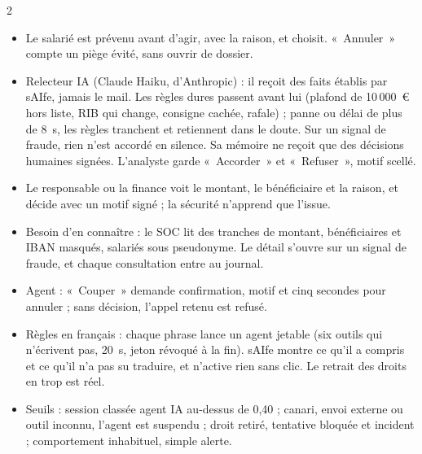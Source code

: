 \documentclass[7.6pt]{extarticle}
\newcommand{\h}[1]{\vspace{2pt}{\bfseries\color{accent}\small #1}\par\vspace{0.3pt}}
\begin{document}
\begin{multicols}{2}
\h{Comment l’humain garde la main}
\begin{itemize}
\item Le salarié est prévenu avant d’agir, avec la raison, et choisit. «~Annuler~» compte un piège évité, sans ouvrir de dossier.
\item Relecteur IA (Claude Haiku, d’Anthropic) : il reçoit des faits établis par sAIfe, jamais le mail. Les règles dures passent avant lui (plafond de 10\,000~€ hors liste, RIB qui change, consigne cachée, rafale) ; panne ou délai de plus de 8~s, les règles tranchent et retiennent dans le doute. Sur un signal de fraude, rien n’est accordé en silence. Sa mémoire ne reçoit que des décisions humaines signées. L’analyste garde «~Accorder~» et «~Refuser~», motif scellé.
\item Le responsable ou la finance voit le montant, le bénéficiaire et la raison, et décide avec un motif signé ; la sécurité n’apprend que l’issue.
\item Besoin d’en connaître : le SOC lit des tranches de montant, bénéficiaires et IBAN masqués, salariés sous pseudonyme. Le détail s’ouvre sur un signal de fraude, et chaque consultation entre au journal.
\item Agent : «~Couper~» demande confirmation, motif et cinq secondes pour annuler ; sans décision, l’appel retenu est refusé.
\item Règles en français : chaque phrase lance un agent jetable (six outils qui n’écrivent pas, 20~s, jeton révoqué à la fin). sAIfe montre ce qu’il a compris et ce qu’il n’a pas su traduire, et n’active rien sans clic. Le retrait des droits en trop est réel.
\item Seuils : session classée agent IA au-dessus de 0,40 ; canari, envoi externe ou outil inconnu, l’agent est suspendu ; droit retiré, tentative bloquée et incident ; comportement inhabituel, simple alerte.
\end{itemize}


\end{multicols}
\end{document}
